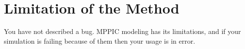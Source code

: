 




\section{Limitation of the \MP Method}
\begin{footcitedquote}[{will, manager of \OF, \url{https://bugs.openfoam.org/view.php?id=3165}}]
    You have not described a bug. MPPIC modeling has its limitations, and if your simulation is failing because of them then your usage is in error.  
\end{footcitedquote}

